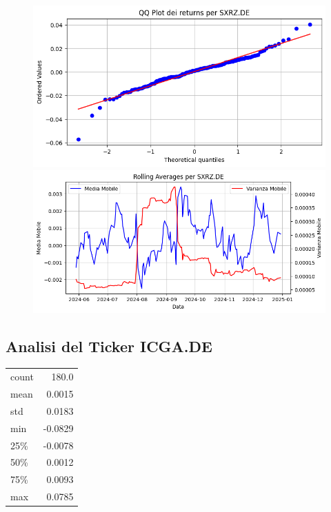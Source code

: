 \documentclass{article}%
\begin{document}
%


\begin{figure}[htbp]%
\begin{minipage}{0.48\textwidth}%
\includegraphics[width=\linewidth]{immagini_tickers/SXRZ.DE_qq_plot.png}%
\end{minipage}%
\begin{minipage}{0.48\textwidth}%
\includegraphics[width=\linewidth]{immagini_tickers/SXRZ.DE_rolling_averages.png}%
\end{minipage}%
\end{figure}

%
\subsection*{Analisi del Ticker ICGA.DE}%
\label{subsec:AnalisidelTickerICGA.DE}%
\begin{tabular}{lr}%
count&180.0\\%
mean&0.0015\\%
std&0.0183\\%
min&{-}0.0829\\%
25\%&{-}0.0078\\%
50\%&0.0012\\%
75\%&0.0093\\%
max&0.0785\\%
\end{tabular}%
\end{document}
